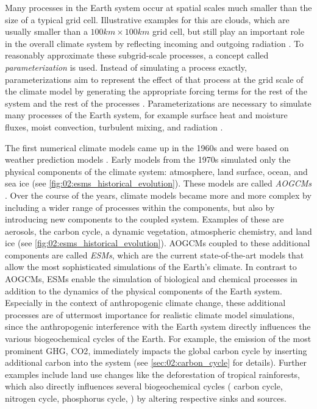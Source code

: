 Many processes in the Earth system occur at spatial scales much smaller than
the size of a typical grid cell. Illustrative examples for this are clouds,
which are usually smaller than a $100 \unit{km} \times 100 \unit{km}$ grid
cell, but still play an important role in the overall climate system by
reflecting incoming and outgoing radiation \autocite{Boucher2013}. To
reasonably approximate these subgrid-scale processes, a concept called
\emph{parameterization} is used. Instead of simulating a process exactly,
parameterizations aim to represent the effect of that process at the grid scale
of the climate model by generating the appropriate forcing terms for the rest
of the system and the rest of the processes \autocite{Gettelman2016}.
Parameterizations are necessary to simulate many processes of the Earth system,
for example surface heat and moisture fluxes, moist convection, turbulent
mixing, and radiation \autocite{Holton2004}.

The first numerical climate models came up in the 1960s and were based on
weather prediction models \autocite{Flato2011}. Early models from the 1970s
simulated only the physical components of the climate system: atmosphere, land
surface, ocean, and sea ice (see \cref{fig:02:esms_historical_evolution}).
These models are called \emph{\acfp{AOGCM}} \autocite{Flato2013}. Over the
course of the years, climate models became more and more complex by including a
wider range of processes within the components, but also by introducing new
components to the coupled system. Examples of these are aerosols, the carbon
cycle, a dynamic vegetation, atmospheric chemistry, and land ice (see
\cref{fig:02:esms_historical_evolution}). \Acp{AOGCM} coupled to these
additional components are called \emph{\acfp{ESM}}, which are the current
state-of-the-art models that allow the most sophisticated simulations of the
Earth's climate. In contrast to \acp{AOGCM}, \acp{ESM} enable the simulation of
biological and chemical processes in addition to the dynamics of the physical
components of the Earth system. Especially in the context of anthropogenic
climate change, these additional processes are of uttermost importance for
realistic climate model simulations, since the anthropogenic interference with
the Earth system directly influences the various biogeochemical cycles of the
Earth. For example, the emission of the most prominent \ac{GHG}, \ac{CO2},
immediately impacts the global carbon cycle by inserting additional carbon into
the system (see \cref{sec:02:carbon_cycle} for details). Further examples
include land use changes like the deforestation of tropical rainforests, which
also directly influences several biogeochemical cycles (\eg{} carbon cycle,
nitrogen cycle, phosphorus cycle, \etc{}) by altering respective sinks and
sources.

